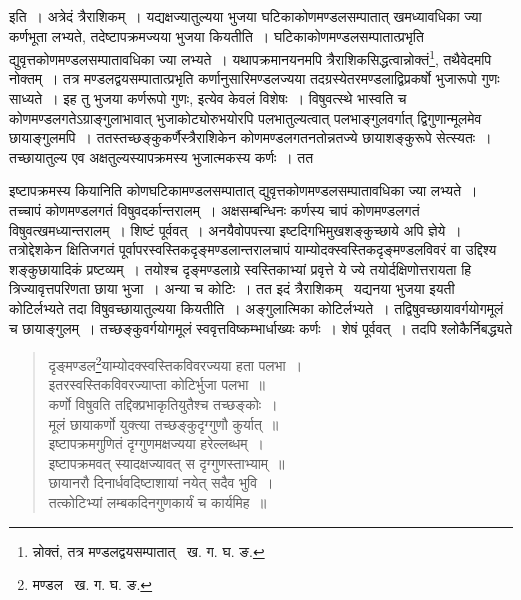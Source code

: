 \documentclass[11pt, openany]{book}
\begin{document}
\noindent इति~। अत्रेदं त्रैराशिकम्~। यद्यक्षज्यातुल्यया भुजया घटिकाकोणमण्डलसम्पातात् खमध्यावधिका ज्या कर्णभूता लभ्यते, तदेष्टापक्रमज्यया भुजया कियतीति~। घटिकाकोणमण्डलसम्पातात्प्रभृति द्युवृत्तकोणमण्डलसम्पातावधिका ज्या लभ्यते~। यथापक्रमानयनमपि त्रैराशिकसिद्धत्वान्नोक्तं\renewcommand{\thefootnote}{३}\footnote{न्नोक्तं, तत्र मण्डलद्वयसम्पातात् \textendash\ ख. ग. घ. ङ.}, तथैवेदमपि नोक्तम्~। तत्र मण्डलद्वयसम्पातात्प्रभृति कर्णानुसारिमण्डलज्यया तदग्रस्येतरमण्डलाद्विप्रकर्षो भुजारूपो गुणः साध्यते~। इह तु भुजया कर्णरूपो गुणः, इत्येव केवलं विशेषः~। विषुवत्स्थे भास्वति च कोणमण्डलगतेऽग्राङ्गुलाभावात् भुजाकोट्योरुभयोरपि पलभातुल्यत्वात् पलभाङ्गुलवर्गात् द्विगुणान्मूलमेव छायाङ्गुलमपि~। ततस्तच्छङ्कुकर्णैस्त्रैराशिकेन कोणमण्डलगतनतोन्नतज्ये छायाशङ्कुरूपे सेत्स्यतः~। 
तच्छायातुल्य एव अक्षतुल्यस्यापक्रमस्य भुजात्मकस्य कर्णः~। तत 

\newpage

\noindent इष्टापक्रमस्य कियानिति कोणघटिकामण्डलसम्पातात् द्युवृत्तकोणमण्डलसम्पातावधिका ज्या लभ्यते~। तच्चापं कोणमण्डलगतं विषुवदर्कान्तरालम्~। अक्षसम्बन्धिनः कर्णस्य चापं कोणमण्डलगतं विषुवत्खमध्यान्तरालम्~। शिष्टं पूर्ववत्~। अनयैवोपपत्त्या इष्टदिगभिमुखशङ्कुच्छाये अपि ज्ञेये~। तत्रोद्देशकेन क्षितिजगतं पूर्वापरस्वस्तिकदृङ्मण्डलान्तरालचापं याम्योदक्स्वस्तिकदृङ्मण्डलविवरं वा उद्दिश्य शङ्कुछायादिकं प्रष्टव्यम्~। तयोश्च दृङ्मण्डलाग्रे स्वस्तिकाभ्यां प्रवृत्ते ये ज्ये तयोर्दक्षिणोत्तरायता हि त्रिज्यावृत्तपरिणता छाया भुजा~। अन्या च कोटिः~। तत इदं त्रैराशिकम् \textendash\ यद्यनया भुजया इयती कोटिर्लभ्यते तदा विषुवच्छायातुल्यया कियतीति~। अङ्गुलात्मिका कोटिर्लभ्यते~। तद्विषुवच्छायावर्गयोगमूलं च छायाङ्गुलम्~। तच्छङ्कुवर्गयोगमूलं स्ववृत्तविष्कम्भार्धाख्यः कर्णः~। शेषं पूर्ववत्~। तदपि श्लोकैर्निबद्ध्यते\textendash  
\begin{quote}
{\qt दृङ्मण्डल\renewcommand{\thefootnote}{१}\footnote{मण्डल \textendash\ ख. ग. घ. ङ.}याम्योदक्स्वस्तिकविवरज्यया हता पलभा~। \\
 इतरस्वस्तिकविवरज्याप्ता कोटिर्भुजा पलभा~॥\\
 कर्णो विषुवति तद्दिक्प्रभाकृतियुतैश्च तच्छङ्कोः~। \\
 मूलं छायाकर्णो युक्त्या तच्छङ्कुदृग्गुणौ कुर्यात्~॥ \\
 इष्टापक्रमगुणितं दृग्गुणमक्षज्यया हरेल्लब्धम्~। \\
 इष्टापक्रमवत् स्यादक्षज्यावत् स दृग्गुणस्ताभ्याम्~॥ \\
 छायानरौ दिनार्धवदिष्टाशायां नयेत् सदैव भुवि~। \\
 तत्कोटिभ्यां लम्बकदिनगुणकार्यं च कार्यमिह~॥}
\end{quote}
\end{document}
